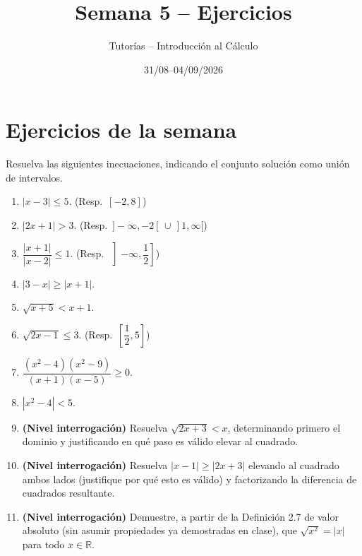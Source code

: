 \documentclass[11pt]{article}
\title{Semana 5 -- Ejercicios}
\author{Tutorías -- Introducción al Cálculo}
\date{31/08--04/09/2026}
\begin{document}
\maketitle

\section{Ejercicios de la semana}

Resuelva las siguientes inecuaciones, indicando el conjunto solución como unión de intervalos.

\begin{enumerate}
    \item $|x-3| \le 5$. \hfill (Resp.\ $[-2,8]$)
    \item $|2x+1| > 3$. \hfill (Resp.\ $]-\infty,-2[\,\cup\,]1,\infty[$)
    \item $\dfrac{|x+1|}{|x-2|} \le 1$. \hfill (Resp.\ $\left]-\infty,\dfrac{1}{2}\right]$)
    \item $|3-x| \ge |x+1|$.
    \item $\sqrt{x+5} < x+1$.
    \item $\sqrt{2x-1} \le 3$. \hfill (Resp.\ $\left[\dfrac{1}{2},5\right]$)
    \item $\dfrac{(x^2-4)(x^2-9)}{(x+1)(x-5)} \ge 0$.
    \item $|x^2-4| < 5$.

    \item \textbf{(Nivel interrogación)} Resuelva $\sqrt{2x+3} < x$, determinando primero el
    dominio y justificando en qué paso es válido elevar al cuadrado.

    \item \textbf{(Nivel interrogación)} Resuelva $|x-1| \ge |2x+3|$ elevando al cuadrado ambos
    lados (justifique por qué esto es válido) y factorizando la diferencia de cuadrados
    resultante.

    \item \textbf{(Nivel interrogación)} Demuestre, a partir de la Definición 2.7 de valor
    absoluto (sin asumir propiedades ya demostradas en clase), que $\sqrt{x^2} = |x|$ para todo
    $x\in\mathbb{R}$.
\end{enumerate}
\end{document}
